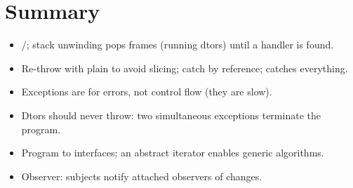\section*{Summary}
\begin{itemize}
  \item {}/; stack unwinding pops frames (running dtors)
        until a handler is found.
  \item Re-throw with plain  to avoid slicing; catch by reference;
         catches everything.
  \item Exceptions are for errors, not control flow (they are slow).
  \item Dtors should never throw: two simultaneous exceptions terminate the
        program.
  \item Program to interfaces; an abstract iterator enables generic algorithms.
  \item Observer: subjects notify attached observers of changes.
\end{itemize}
